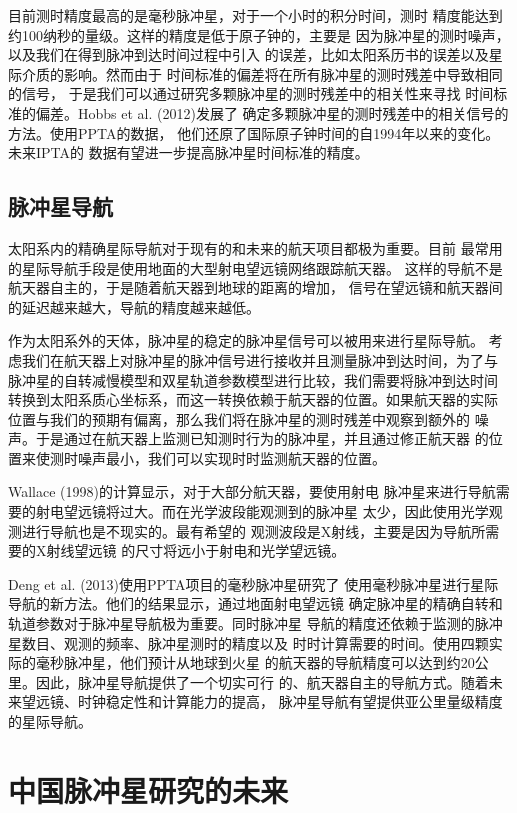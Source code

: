 目前测时精度最高的是毫秒脉冲星，对于一个小时的积分时间，测时
精度能达到约100纳秒的量级。这样的精度是低于原子钟的，主要是
因为脉冲星的测时噪声，以及我们在得到脉冲到达时间过程中引入
的误差，比如太阳系历书的误差以及星际介质的影响。然而由于
时间标准的偏差将在所有脉冲星的测时残差中导致相同的信号，
于是我们可以通过研究多颗脉冲星的测时残差中的相关性来寻找
时间标准的偏差。Hobbs et al. (2012)\supercite{hcm+12}发展了
确定多颗脉冲星的测时残差中的相关信号的方法。使用PPTA的数据，
他们还原了国际原子钟时间的自1994年以来的变化。未来IPTA的
数据有望进一步提高脉冲星时间标准的精度。

\subsection{脉冲星导航}

太阳系内的精确星际导航对于现有的和未来的航天项目都极为重要。目前
最常用的星际导航手段是使用地面的大型射电望远镜网络跟踪航天器。
这样的导航不是航天器自主的，于是随着航天器到地球的距离的增加，
信号在望远镜和航天器间的延迟越来越大，导航的精度越来越低。

作为太阳系外的天体，脉冲星的稳定的脉冲星信号可以被用来进行星际导航。
考虑我们在航天器上对脉冲星的脉冲信号进行接收并且测量脉冲到达时间，为了与
脉冲星的自转减慢模型和双星轨道参数模型进行比较，我们需要将脉冲到达时间
转换到太阳系质心坐标系，而这一转换依赖于航天器的位置。如果航天器的实际
位置与我们的预期有偏离，那么我们将在脉冲星的测时残差中观察到额外的
噪声。于是通过在航天器上监测已知测时行为的脉冲星，并且通过修正航天器
的位置来使测时噪声最小，我们可以实现时时监测航天器的位置。

Wallace (1998)\supercite{wal88}的计算显示，对于大部分航天器，要使用射电
脉冲星来进行导航需要的射电望远镜将过大。而在光学波段能观测到的脉冲星
太少，因此使用光学观测进行导航也是不现实的\supercite{sg01}。最有希望的
观测波段是X射线\supercite{cb81}，主要是因为导航所需要的X射线望远镜
的尺寸将远小于射电和光学望远镜\supercite{she05}。

Deng et al. (2013)\supercite{dhy+13}使用PPTA项目的毫秒脉冲星研究了
使用毫秒脉冲星进行星际导航的新方法。他们的结果显示，通过地面射电望远镜
确定脉冲星的精确自转和轨道参数对于脉冲星导航极为重要。同时脉冲星
导航的精度还依赖于监测的脉冲星数目、观测的频率、脉冲星测时的精度以及
时时计算需要的时间。使用四颗实际的毫秒脉冲星，他们预计从地球到火星
的航天器的导航精度可以达到约20公里。因此，脉冲星导航提供了一个切实可行
的、航天器自主的导航方式。随着未来望远镜、时钟稳定性和计算能力的提高，
脉冲星导航有望提供亚公里量级精度的星际导航。

\section{中国脉冲星研究的未来}

